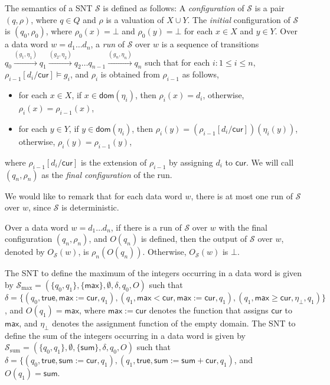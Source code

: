 \documentclass[runningheads,a4paper]{llncs}
\def\Ss{{\mathcal{S} }}
\newcommand\cur{\mathsf{cur}}
\newcommand\dom{\mathsf{dom}}
\newcommand\ltrue{\mathsf{true}}
\newcommand\maxv{\mathsf{max}}
\newcommand\sumv{\mathsf{sum}}
\begin{document}
The semantics of a SNT $\Ss$  is defined as follows: A \emph{configuration} of $\Ss$ is a pair $(q,\rho)$, where $q \in Q$ and $\rho$ is a valuation of $X \cup Y$. The \emph{initial} configuration of $\Ss$ is $(q_0,\rho_0)$, where $\rho_0(x)=\bot$ and $\rho_0(y)=\bot$ for each $x \in X$ and $y \in Y$. Over a data word $w=d_1 \dots d_n$, a \emph{run} of $\Ss$ over $w$ is a sequence of transitions $q_0 \xrightarrow{(g_1,\eta_1)} q_1 \xrightarrow{(g_2,\eta_2)} q_2 \dots q_{n-1} \xrightarrow{(g_n, \eta_n)} q_n$ such that for each $i: 1 \le i \le n$, $\rho_{i-1}[d_i/\cur]  \models g_i$, and $\rho_i$ is obtained from $\rho_{i-1}$ as follows,
\begin{itemize}
\item for each $x \in X$, if $ x \in \dom(\eta_i)$, then $\rho_i(x)=d_i$, otherwise, $\rho_i(x)=\rho_{i-1}(x)$,
%
\item for each $y \in Y$, if $y \in \dom(\eta_i)$, then $\rho_i(y)=(\rho_{i-1}[d_i/\cur])(\eta_i(y))$, otherwise, $\rho_i(y)=\rho_{i-1}(y)$,
\end{itemize}
where $\rho_{i-1}[d_i/\cur]$ is the extension of $\rho_{i-1}$ by assigning $d_i$ to $\cur$. We will call $(q_n,\rho_n)$ as the \emph{final configuration} of the run.

We would like to remark that for each data word $w$, there is at most one run of $\Ss$ over $w$, since $\Ss$ is deterministic. 

Over a data word $w = d_1 \dots d_n$, if there is a run of $\Ss$ over $w$ with the final configuration $(q_n,\rho_n)$, and $O(q_n)$ is defined, then the output of $\Ss$ over $w$, denoted by $O_{\Ss}(w)$, is $\rho_n(O(q_n))$. Otherwise, $O_{\Ss}(w)$ is $\bot$.

\begin{example}
The SNT to define the maximum of the integers occurring in a data word is given by $\Ss_{\max}=(\{q_0,q_1\}, \{\maxv\}, \emptyset, \delta, q_0, O)$  such that $\delta = \{(q_0, \ltrue, \maxv:=\cur, q_1), (q_1, \maxv < \cur, \maxv:=\cur,q_1), (q_1, \maxv \ge \cur, \eta_\bot, q_1)\}$, and $O(q_1)=\maxv$, where $\maxv:=\cur$ denotes the function that assigns $\cur$ to $\maxv$, and $\eta_\bot$ denotes the assignment function of the empty domain. The SNT to define the sum of the integers occurring in a data word is given by $\Ss_{\mathrm{sum}}=(\{q_0,q_1\}, \emptyset, \{\sumv\}, \delta, q_0, O)$ such that $\delta=\{(q_0, \ltrue, \sumv:=\cur, q_1), (q_1, \ltrue, \sumv:=\sumv + \cur, q_1)$, and $O(q_1)=\sumv$. 
\end{example}
\end{document}
